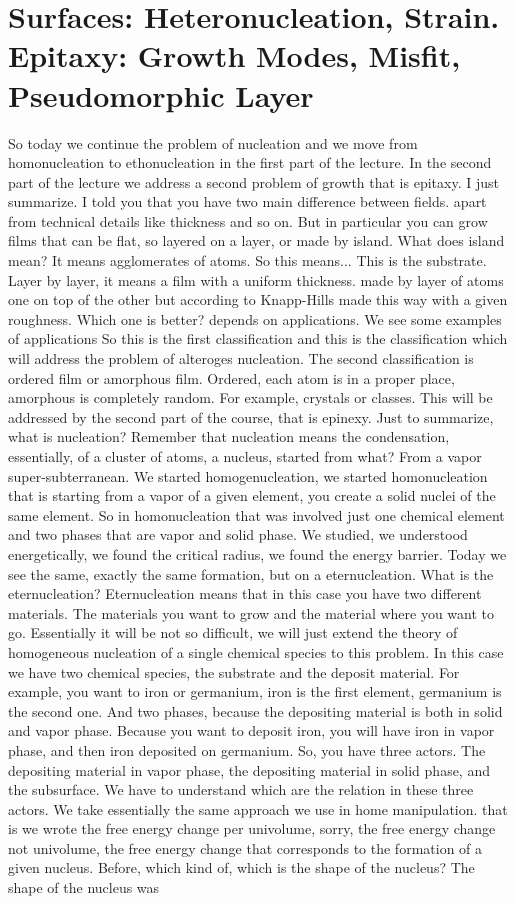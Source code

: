 \chapter{Surfaces: Heteronucleation, Strain. Epitaxy: Growth Modes, Misfit, Pseudomorphic Layer}
So today we continue the problem of nucleation and we move from homonucleation to ethonucleation in the first part of the lecture. In the second part of the lecture we address a second problem of growth that is epitaxy. I just summarize. I told you that you have two main difference between fields. apart from technical details like thickness and so on. But in particular you can grow films that can be flat, so layered on a layer, or made by island. What does island mean? It means agglomerates of atoms. So this means... This is the substrate. Layer by layer, it means a film with a uniform thickness. made by layer of atoms one on top of the other but according to Knapp-Hills made this way with a given roughness. Which one is better? depends on applications. We see some examples of applications So this is the first classification and this is the classification which will address the problem of alteroges nucleation. The second classification is ordered film or amorphous film. Ordered, each atom is in a proper place, amorphous is completely random. For example, crystals or classes. This will be addressed by the second part of the course, that is epinexy. Just to summarize, what is nucleation? Remember that nucleation means the condensation, essentially, of a cluster of atoms, a nucleus, started from what? From a vapor super-subterranean. We started homogenucleation, we started homonucleation that is starting from a vapor of a given element, you create a solid nuclei of the same element. So in homonucleation that was involved just one chemical element and two phases that are vapor and solid phase. We studied, we understood energetically, we found the critical radius, we found the energy barrier. Today we see the same, exactly the same formation, but on a eternucleation. What is the eternucleation? Eternucleation means that in this case you have two different materials. The materials you want to grow and the material where you want to go. Essentially it will be not so difficult, we will just extend the theory of homogeneous nucleation of a single chemical species to this problem. In this case we have two chemical species, the substrate and the deposit material. For example, you want to iron or germanium, iron is the first element, germanium is the second one. And two phases, because the depositing material is both in solid and vapor phase. Because you want to deposit iron, you will have iron in vapor phase, and then iron deposited on germanium. So, you have three actors. The depositing material in vapor phase, the depositing material in solid phase, and the subsurface. We have to understand which are the relation in these three actors. We take essentially the same approach we use in home manipulation. that is we wrote the free energy change per univolume, sorry, the free energy change not univolume, the free energy change that corresponds to the formation of a given nucleus. Before, which kind of, which is the shape of the nucleus? The shape of the nucleus was 